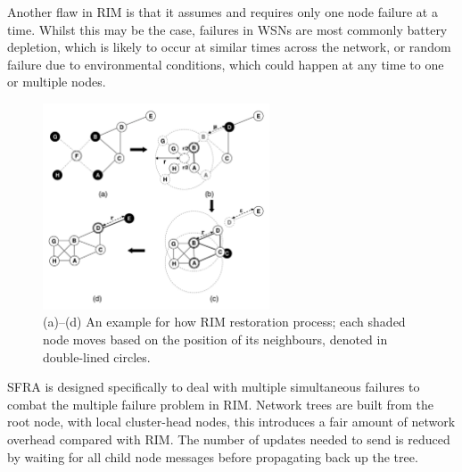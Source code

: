 \documentclass[authoryearcitations]{UoYCSproject}
\begin{document}
Another flaw in RIM is that it assumes and requires only one node failure at a time. Whilst this may be the case, failures in WSNs are most commonly battery depletion, which is likely to occur at similar times across the network, or random failure due to environmental conditions, which could happen at any time to one or multiple nodes.

\begin{figure}
 \centering
    \includegraphics[width=0.6\textwidth]{figures/rim.png}
    \caption{(a)--(d) An example for how RIM restoration process; each shaded node moves based on the position of its neighbours, denoted in double-lined circles.}
    \label{fig:rim}
\end{figure}



SFRA \citep{Alfadhly2012} is designed specifically to deal with multiple simultaneous failures to combat the multiple failure problem in RIM. Network trees are built from the root node, with local cluster-head nodes, this introduces a fair amount of network overhead compared with RIM. The number of updates needed to send is reduced by waiting for all child node messages before propagating back up the tree.
\end{document}
